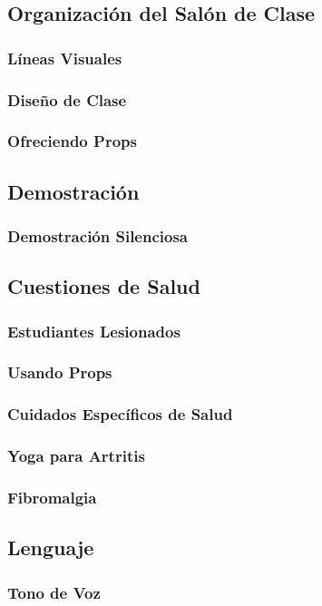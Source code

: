 \documentclass[a4paper]{article}
\begin{document}
\subsection{Organización del Salón de Clase}
\subsubsection{Líneas Visuales}
\subsubsection{Diseño de Clase}
\subsubsection{Ofreciendo Props}
\subsection{Demostración}
\subsubsection{Demostración Silenciosa}
\subsection{Cuestiones de Salud}
\subsubsection{Estudiantes Lesionados}
\subsubsection{Usando Props}
\subsubsection{Cuidados Específicos de Salud}
\subsubsection{Yoga para Artritis}
\subsubsection{Fibromalgia}
\subsection{Lenguaje}
\subsubsection{Tono de Voz}
\end{document}
